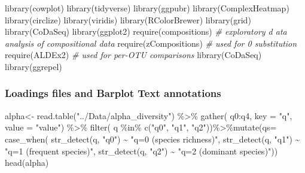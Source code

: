 \documentclass[]{interact}
\theoremstyle{plain}%
\theoremstyle{definition}
\theoremstyle{remark}
\newenvironment{Shaded}{\begin{snugshade}}{\end{snugshade}}
\newcommand{\AttributeTok}[1]{\textcolor[rgb]{0.77,0.63,0.00}{#1}}
\newcommand{\CommentTok}[1]{\textcolor[rgb]{0.56,0.35,0.01}{\textit{#1}}}
\newcommand{\FunctionTok}[1]{\textcolor[rgb]{0.00,0.00,0.00}{#1}}
\newcommand{\NormalTok}[1]{#1}
\newcommand{\OtherTok}[1]{\textcolor[rgb]{0.56,0.35,0.01}{#1}}
\newcommand{\SpecialCharTok}[1]{\textcolor[rgb]{0.00,0.00,0.00}{#1}}
\newcommand{\StringTok}[1]{\textcolor[rgb]{0.31,0.60,0.02}{#1}}
\begin{document}
\begin{Shaded}
\begin{Highlighting}[]
\FunctionTok{library}\NormalTok{(cowplot)}
\FunctionTok{library}\NormalTok{(tidyverse)}
\FunctionTok{library}\NormalTok{(ggpubr)}
\FunctionTok{library}\NormalTok{(ComplexHeatmap)}
\FunctionTok{library}\NormalTok{(circlize)}
\FunctionTok{library}\NormalTok{(viridis)}
\FunctionTok{library}\NormalTok{(RColorBrewer)}
\FunctionTok{library}\NormalTok{(grid)}
\FunctionTok{library}\NormalTok{(CoDaSeq)}
\FunctionTok{library}\NormalTok{(ggplot2)}
\FunctionTok{require}\NormalTok{(compositions) }\CommentTok{\# exploratory d ata analysis of compositional data}
\FunctionTok{require}\NormalTok{(zCompositions) }\CommentTok{\# used for 0 substitution}
\FunctionTok{require}\NormalTok{(ALDEx2) }\CommentTok{\# used for per{-}OTU comparisons}
\FunctionTok{library}\NormalTok{(CoDaSeq)}
\FunctionTok{library}\NormalTok{(ggrepel)}
\end{Highlighting}
\end{Shaded}

\hypertarget{loadings-files-and-barplot-text-annotations}{%
\subsubsection{Loadings files and Barplot Text
annotations}\label{loadings-files-and-barplot-text-annotations}}

\begin{Shaded}
\begin{Highlighting}[]
\NormalTok{alpha}\OtherTok{\textless{}{-}} \FunctionTok{read.table}\NormalTok{(}\StringTok{"../Data/alpha\_diversity"}\NormalTok{) }\SpecialCharTok{\%\textgreater{}\%} \FunctionTok{gather}\NormalTok{(}
\NormalTok{  q0}\SpecialCharTok{:}\NormalTok{q4, }\AttributeTok{key =} \StringTok{"q"}\NormalTok{, }\AttributeTok{value =} \StringTok{"value"}\NormalTok{) }\SpecialCharTok{\%\textgreater{}\%} \FunctionTok{filter}\NormalTok{(}
\NormalTok{    q }\SpecialCharTok{\%in\%} \FunctionTok{c}\NormalTok{(}\StringTok{"q0"}\NormalTok{, }\StringTok{"q1"}\NormalTok{, }\StringTok{"q2"}\NormalTok{))}\SpecialCharTok{\%\textgreater{}\%}\FunctionTok{mutate}\NormalTok{(}\AttributeTok{qs=} \FunctionTok{case\_when}\NormalTok{(}
  \FunctionTok{str\_detect}\NormalTok{(q, }\StringTok{"q0"}\NormalTok{) }\SpecialCharTok{\textasciitilde{}} \StringTok{"q=0 (species richness)"}\NormalTok{,}
  \FunctionTok{str\_detect}\NormalTok{(q, }\StringTok{"q1"}\NormalTok{) }\SpecialCharTok{\textasciitilde{}} \StringTok{"q=1 (frequent species)"}\NormalTok{,}
  \FunctionTok{str\_detect}\NormalTok{(q, }\StringTok{"q2"}\NormalTok{) }\SpecialCharTok{\textasciitilde{}} \StringTok{"q=2 (dominant species)"}\NormalTok{))}
\FunctionTok{head}\NormalTok{(alpha)}
\end{Highlighting}
\end{Shaded}
\end{document}
